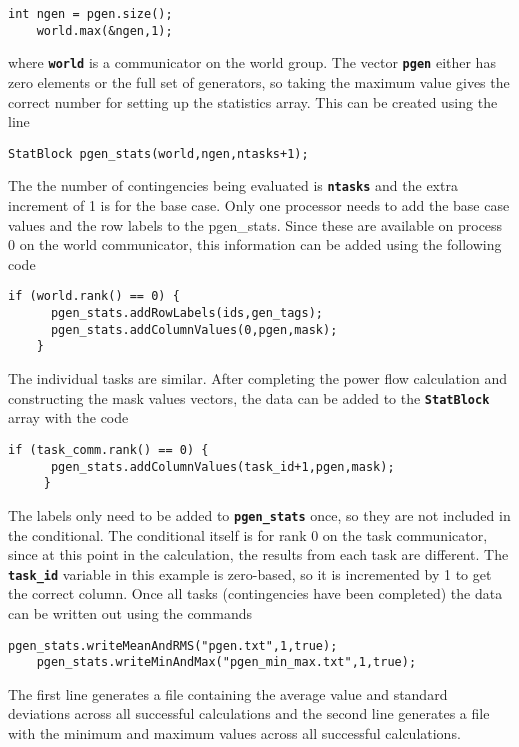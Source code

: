 {
\color{red}
\begin{Verbatim}[fontseries=b]
    int ngen = pgen.size();
    world.max(&ngen,1);
\end{Verbatim}
}

where \texttt{\textbf{world}} is a communicator on the world group. The vector \texttt{\textbf{pgen}} either has zero elements or the full set of generators, so taking the maximum value gives the correct number for setting up the statistics array. This can be created using the line

{
\color{red}
\begin{Verbatim}[fontseries=b]
    StatBlock pgen_stats(world,ngen,ntasks+1);
\end{Verbatim}
}

The the number of contingencies being evaluated is \texttt{\textbf{ntasks}} and the extra increment of 1 is for the base case. Only one processor needs to add the base case values and the row labels to the pgen\_stats. Since these are available on process 0 on the world communicator, this information can be added using the following code

{
\color{red}
\begin{Verbatim}[fontseries=b]
    if (world.rank() == 0) {
      pgen_stats.addRowLabels(ids,gen_tags);
      pgen_stats.addColumnValues(0,pgen,mask);
    }
\end{Verbatim}
}

The individual tasks are similar. After completing the power flow calculation and constructing the mask values vectors, the data can be added to the \texttt{\textbf{StatBlock}} array with the code

{
\color{red}
\begin{Verbatim}[fontseries=b]
     if (task_comm.rank() == 0) {
      pgen_stats.addColumnValues(task_id+1,pgen,mask);
     }
\end{Verbatim}
}

The labels only need to be added to \texttt{\textbf{pgen\_stats}} once, so they are not included in the conditional. The conditional itself is for rank 0 on the task communicator, since at this point in the calculation, the results from each task are different. The \texttt{\textbf{task\_id}} variable in this example is zero-based, so it is incremented by 1 to get the correct column.
Once all tasks (contingencies have been completed) the data can be written out using the commands

{
\color{red}
\begin{Verbatim}[fontseries=b]
    pgen_stats.writeMeanAndRMS("pgen.txt",1,true);
    pgen_stats.writeMinAndMax("pgen_min_max.txt",1,true);
\end{Verbatim}
}

The first line generates a file containing the average value and standard deviations across all successful calculations and the second line generates a file with the minimum and maximum values across all successful calculations.

